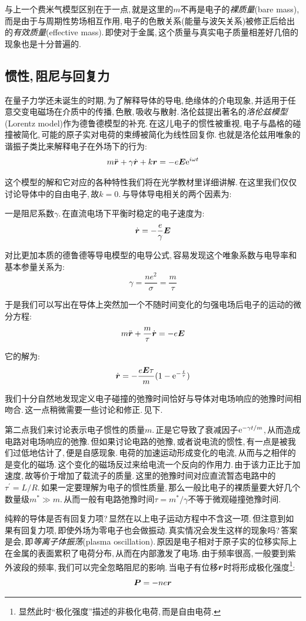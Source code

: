 与上一个费米气模型区别在于一点,\,就是这里的$m$不再是电子的\emph{裸质量}(bare mass),\,而是由于与周期性势场相互作用,\,电子的色散关系(能量与波矢关系)被修正后给出的\emph{有效质量}(effective mass).\,即使对于金属,\,这个质量与真实电子质量相差好几倍的现象也是十分普遍的.



\subsection{惯性,\,阻尼与回复力}

在量子力学还未诞生的时期,\,为了解释导体的导电,\,绝缘体的介电现象,\,并适用于任意交变电磁场在介质中的传播,\,色散,\,吸收与散射.\,洛伦兹提出著名的\emph{洛伦兹模型}(Lorentz model)作为德鲁德模型的补充.\,在这儿电子的惯性被重视,\,电子与晶格的碰撞被简化,\,可能的原子实对电荷的束缚被简化为线性回复你.\,也就是洛伦兹用唯象的谐振子类比来解释电子在外场下的行为:
\[m\ddot{\boldsymbol{r}}+\gamma \dot{\boldsymbol{r}}+ k\boldsymbol{r}=-e\boldsymbol{E}{\rm e}^{i\omega t}\]

这个模型的解和它对应的各种特性我们将在光学教材里详细讲解.\,在这里我们仅仅讨论导体中的自由电子,\,故$k=0$.\,与导体导电相关的两个因素为:

一是阻尼系数$\gamma$.\,在直流电场下平衡时稳定的电子速度为:
\[\dot{\boldsymbol{r}}=-\frac{e}{\gamma}\boldsymbol{E}\]

对比更加本质的德鲁德等导电模型的电导公式,\,容易发现这个唯象系数与电导率和基本参量关系为:
\[\gamma=\frac{ne^2}{\sigma}=\frac{m}{\tau}\]

于是我们可以写出在导体上突然加一个不随时间变化的匀强电场后电子的运动的微分方程:
\[m\ddot{\boldsymbol{r}}+\frac{m}{\tau} \dot{\boldsymbol{r}}=-e\boldsymbol{E}\]

它的解为:
\[\dot{\boldsymbol{r}}=-\frac{e\boldsymbol{E}\tau}{m}(1-{\rm e}^{-\frac{t}{\tau}})\]

我们十分自然地发现定义电子碰撞的弛豫时间恰好与导体对电场响应的弛豫时间相吻合.\,这一点稍微需要一些讨论和修正.\,见下.

第二点我们来讨论表示电子惯性的质量$m$.\,正是它导致了衰减因子${\rm e}^{-\gamma t/m}$,\,从而造成电路对电场响应的弛豫.\,但如果讨论电路的弛豫,\,或者说电流的惯性,\,有一点是被我们过低地估计了,\,便是自感现象.\,电荷的加速运动形成变化的电流,\,从而与之相伴的是变化的磁场.\,这个变化的磁场反过来给电流一个反向的作用力.\,由于该力正比于加速度,\,故等价于增加了载流子的质量.\,这里的弛豫时间对应直流暂态电路中的$\tau^\prime=L/R$.\,如果一定要理解为电子的惯性质量,\,那么一般比电子的裸质量要大好几个数量级$m^\ast\gg m$.\,从而一般有电路弛豫时间$\tau=m^\ast/\gamma$不等于微观碰撞弛豫时间.

纯粹的导体是否有回复力项?\,显然在以上电子运动方程中不含这一项.\,但注意到如果有回复力项,\,即使外场为零电子也会做振动.\,真实情况会发生这样的现象吗?\,答案是会,\,即\emph{等离子体振荡}(plasma oscillation).\,原因是电子相对于原子实的位移实际上在金属的表面累积了电荷分布,\,从而在内部激发了电场.\,由于频率很高,\,一般要到紫外波段的频率,\,我们可以完全忽略阻尼的影响.\,当电子有位移$\boldsymbol{r}$时将形成极化强度\footnote{显然此时``极化强度''描述的非极化电荷,\,而是自由电荷.}:
\[\boldsymbol{P}=-ne\boldsymbol{r}\]

